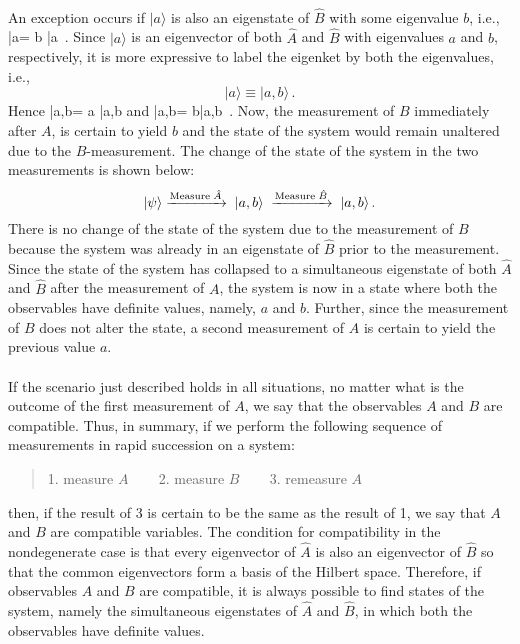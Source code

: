 \paragraph{}
An exception occurs if $|a\rangle$ is also an eigenstate of $\hat{B}$ with some eigenvalue $b$, i.e., 
\be
{}|a\rangle = b |a\rangle \, . 
\ee
Since $|a\rangle$ is an eigenvector of both $\hat{A}$ and $\hat{B}$ with eigenvalues $a$ and $b$, respectively, it is more expressive to label the eigenket by both the eigenvalues, i.e.,
\[ |a\rangle \equiv |a,b\rangle\, . \]
Hence 
\be
{}|a,b\rangle = a |a,b\rangle
\ee
and
\be
{}|a,b\rangle = b|a,b\rangle\, .
\ee
Now, the measurement of $B$ immediately after $A$, is certain to yield $b$ and the state of the system would remain unaltered due to the $B$-measurement. The change of the state of the system in the two measurements is shown below:
\[ |\psi\rangle \xrightarrow{{\rm Measure} \; \hat{A}}\; |a,b\rangle\; \xrightarrow{{\rm Measure} \; \hat{B}}\; |a,b\rangle \, . \]
There is no change of the state of the system due to the measurement of $B$ because the system was already in an eigenstate of $\hat{B}$
prior to the measurement. Since the state of the system has collapsed to a simultaneous eigenstate of both $\hat{A}$ and
$\hat{B}$ after the measurement of $A$, the system is now in a state where both the observables have definite values, namely, $a$ 
and $b$. Further, since the measurement of $B$ does not alter the state, a second measurement of $A$ is certain to yield the previous value $a$. 

\paragraph{}
If the scenario just described holds in all situations, no matter what is the outcome of the first measurement of $A$, we say that the observables $A$ and $B$ are compatible. Thus, in summary, if we perform the following sequence of measurements in rapid succession on a system:
\begin{quote}
1. measure $A$ ~~~ 2. measure $B$ ~~~ 3. remeasure $A$
\end{quote}
then, if the result of 3 is certain to be the same as the result of 1, we say that $A$ and $B$ are compatible variables. The condition for compatibility in the nondegenerate case is that every eigenvector of $\hat{A}$ is also an eigenvector of $\hat{B}$
so that the common eigenvectors form a basis of the Hilbert space. Therefore, if observables $A$ and $B$ are compatible, it is always possible to find states of the system, namely the simultaneous eigenstates of $\hat{A}$ and $\hat{B}$, in which both the observables
have definite values.

